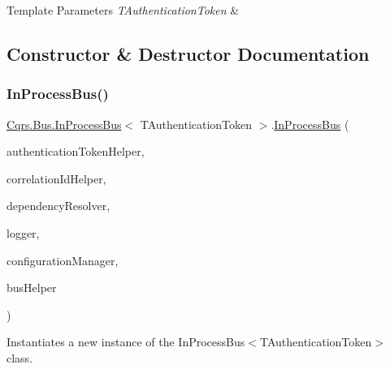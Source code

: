 \begin{DoxyTemplParams}{Template Parameters}
{\em T\+Authentication\+Token} & \\
\hline
\end{DoxyTemplParams}


\subsection{Constructor \& Destructor Documentation}
\mbox{\label{classCqrs_1_1Bus_1_1InProcessBus_a64bea583461562783d97cd98ff0dff91_a64bea583461562783d97cd98ff0dff91}} 
\subsubsection{\texorpdfstring{In\+Process\+Bus()}{InProcessBus()}}
{\footnotesize\ttfamily \hyperlink{classCqrs_1_1Bus_1_1InProcessBus}{Cqrs.\+Bus.\+In\+Process\+Bus}$<$ T\+Authentication\+Token $>$.\hyperlink{classCqrs_1_1Bus_1_1InProcessBus}{In\+Process\+Bus} (\begin{DoxyParamCaption}\item[{\hyperlink{interfaceCqrs_1_1Authentication_1_1IAuthenticationTokenHelper}{I\+Authentication\+Token\+Helper}$<$ T\+Authentication\+Token $>$}]{authentication\+Token\+Helper,  }\item[{I\+Correlation\+Id\+Helper}]{correlation\+Id\+Helper,  }\item[{\hyperlink{interfaceCqrs_1_1Configuration_1_1IDependencyResolver}{I\+Dependency\+Resolver}}]{dependency\+Resolver,  }\item[{I\+Logger}]{logger,  }\item[{\hyperlink{interfaceCqrs_1_1Configuration_1_1IConfigurationManager}{I\+Configuration\+Manager}}]{configuration\+Manager,  }\item[{\hyperlink{interfaceCqrs_1_1Bus_1_1IBusHelper}{I\+Bus\+Helper}}]{bus\+Helper }\end{DoxyParamCaption})}



Instantiates a new instance of the In\+Process\+Bus$<$\+T\+Authentication\+Token$>$ class. 



